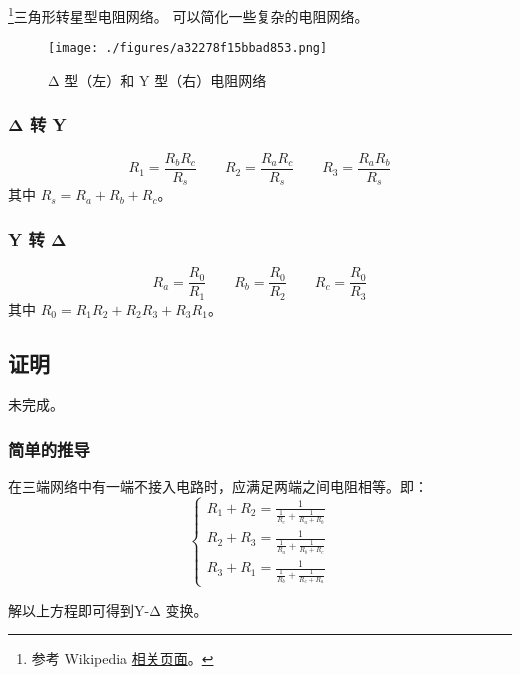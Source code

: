 
\begin{issues}
\issueDraft
\end{issues}

\footnote{参考 Wikipedia \href{https://en.wikipedia.org/wiki/Y-Δ_transform}{相关页面}。}三角形转星型电阻网络。 可以简化一些复杂的电阻网络。

\begin{figure}[ht]
\centering
\texttt{[image: ./figures/a32278f15bbad853.png]}
\caption{Δ 型（左）和 Y 型（右）电阻网络} \label{fig_Tri2St_1}
\end{figure}

\subsubsection{Δ 转 Y}
\begin{equation}
R_1 = \frac{R_b R_c}{R_s} \qquad
R_2 = \frac{R_a R_c}{R_s} \qquad
R_3 = \frac{R_a R_b}{R_s}
\end{equation}
其中 $R_s = R_a + R_b + R_c$。

\subsubsection{Y 转 Δ}
\begin{equation}
R_a = \frac{R_0}{R_1} \qquad
R_b = \frac{R_0}{R_2} \qquad
R_c = \frac{R_0}{R_3}
\end{equation}
其中 $R_0 = R_1 R_2 + R_2 R_3 + R_3 R_1$。

\subsection{证明}
未完成。
\subsubsection{简单的推导}
在三端网络中有一端不接入电路时，应满足两端之间电阻相等。即：
\begin{equation}
\left\{\begin{matrix}R_1+R_2=\frac{1}{\frac{1}{R_c}+\frac{1}{R_a+R_b}}\\R_2+R_3=\frac{1}{\frac{1}{R_a}+\frac{1}{R_b+R_c}}\\R_3+R_1=\frac{1}{\frac{1}{R_b}+\frac{1}{R_c+R_a}}\end{matrix}\right.
\end{equation}

解以上方程即可得到Y-Δ 变换。

